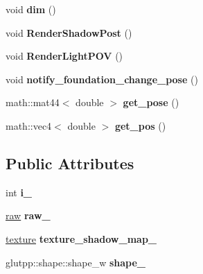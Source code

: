 \begin{DoxyCompactItemize}
\item 
\hypertarget{classglutpp_1_1light_1_1light_a268f34b24b62e9bc6947ffcfd991ef50}{void {\bfseries dim} ()}\label{classglutpp_1_1light_1_1light_a268f34b24b62e9bc6947ffcfd991ef50}

\item 
\hypertarget{classglutpp_1_1light_1_1light_ae6cb64d97584ae3f122fed38a7ec1220}{void {\bfseries \-Render\-Shadow\-Post} ()}\label{classglutpp_1_1light_1_1light_ae6cb64d97584ae3f122fed38a7ec1220}

\item 
\hypertarget{classglutpp_1_1light_1_1light_acf001e6ef0610163c79d487304d10d42}{void {\bfseries \-Render\-Light\-P\-O\-V} ()}\label{classglutpp_1_1light_1_1light_acf001e6ef0610163c79d487304d10d42}

\item 
\hypertarget{classglutpp_1_1light_1_1light_a08584b01145fe402d6441b702577b6cc}{void {\bfseries notify\-\_\-foundation\-\_\-change\-\_\-pose} ()}\label{classglutpp_1_1light_1_1light_a08584b01145fe402d6441b702577b6cc}

\item 
\hypertarget{classglutpp_1_1light_1_1light_a86ff24f6daa48c9bc5eba4d20396d7b5}{math\-::mat44$<$ double $>$ {\bfseries get\-\_\-pose} ()}\label{classglutpp_1_1light_1_1light_a86ff24f6daa48c9bc5eba4d20396d7b5}

\item 
\hypertarget{classglutpp_1_1light_1_1light_af38d00b183b7588383a047d67f40655a}{math\-::vec4$<$ double $>$ {\bfseries get\-\_\-pos} ()}\label{classglutpp_1_1light_1_1light_af38d00b183b7588383a047d67f40655a}

\end{DoxyCompactItemize}
\subsection*{\-Public \-Attributes}
\begin{DoxyCompactItemize}
\item 
\hypertarget{classglutpp_1_1light_1_1light_afa7e0890ce66350d6adad22282ec4a19}{int {\bfseries i\-\_\-}}\label{classglutpp_1_1light_1_1light_afa7e0890ce66350d6adad22282ec4a19}

\item 
\hypertarget{classglutpp_1_1light_1_1light_ac919169305f5dc46e47073308b1d26e1}{\hyperlink{classglutpp_1_1light_1_1raw}{raw} {\bfseries raw\-\_\-}}\label{classglutpp_1_1light_1_1light_ac919169305f5dc46e47073308b1d26e1}

\item 
\hypertarget{classglutpp_1_1light_1_1light_a514b6b13118418366398118bb47291be}{\hyperlink{classglutpp_1_1texture}{texture} {\bfseries texture\-\_\-shadow\-\_\-map\-\_\-}}\label{classglutpp_1_1light_1_1light_a514b6b13118418366398118bb47291be}

\item 
\hypertarget{classglutpp_1_1light_1_1light_abc14ce2d7a706c4c77bf52c9f66692ca}{glutpp\-::shape\-::shape\-\_\-w {\bfseries shape\-\_\-}}\label{classglutpp_1_1light_1_1light_abc14ce2d7a706c4c77bf52c9f66692ca}

\end{DoxyCompactItemize}


